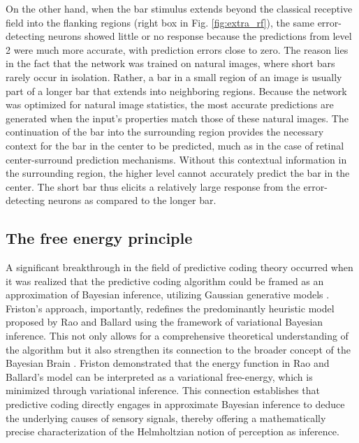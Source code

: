 \documentclass[10pt]{article}
\begin{document}
On the other hand, when the bar stimulus extends beyond the classical receptive field into the flanking regions (right box in Fig. \ref{fig:extra_rf}), the same error-detecting neurons showed little or no response because the predictions from level 2 were much more accurate, with prediction errors close to zero. 
The reason lies in the fact that the network was trained on natural images, where short bars rarely occur in isolation. Rather, a bar in a small region of an image is usually part of a longer bar that extends into neighboring regions. Because the network was optimized for natural image statistics, the most accurate predictions are generated when the input’s properties match those of these natural images. The continuation of the bar into the surrounding region provides the necessary context for the bar in the center to be predicted, much as in the case of retinal center-surround prediction mechanisms. Without this contextual information in the
surrounding region, the higher level cannot accurately predict
the bar in the center. The short bar thus elicits a relatively large response from the error-detecting neurons as compared to the longer bar.

\subsection{The free energy principle}

A significant breakthrough in the field of predictive coding theory occurred when it was realized that the predictive coding algorithm could be framed as an approximation of Bayesian inference, utilizing Gaussian generative models \citep{Friston2005}.
Friston's approach, importantly, redefines the predominantly heuristic model proposed by Rao and Ballard using the framework of variational Bayesian inference. This not only allows for a comprehensive theoretical understanding of the algorithm but it also strengthen its connection to the broader concept of the Bayesian Brain \citep{Knill2004, Doya2007}.
Friston demonstrated that the energy function in Rao and Ballard's model can be interpreted as a variational free-energy, which is minimized through variational inference. This connection establishes that predictive coding directly engages in approximate Bayesian inference to deduce the underlying causes of sensory signals, thereby offering a mathematically precise characterization of the Helmholtzian notion of perception as inference.

\end{document}
